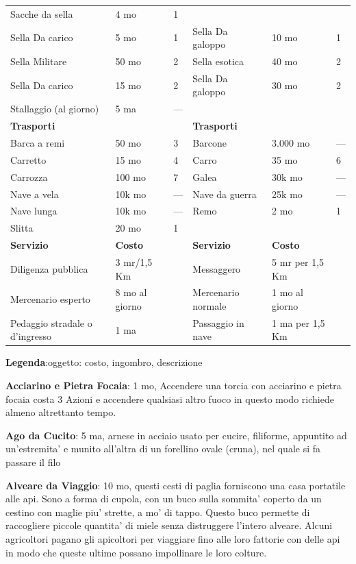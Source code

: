 \documentclass[a4paper,11pt,twoside,openany]{book}
\begin{document}
{\begin{longtable}{|L{4cm} |k{1.5cm} |k{1.5cm}|L{5cm} |k{1.5cm} |k{1.5cm}|}
			Sacche da sella&4 mo&1&&&\\
			Sella Da carico&5 mo&1&	Sella Da galoppo&10 mo&1\\
			Sella Militare&50 mo&2&	Sella esotica &40 mo&2\\
			Sella Da carico&15 mo&2&Sella Da galoppo&30 mo&2\\
			Stallaggio (al giorno)&5 ma&—&&&\\
			\textbf{Trasporti}&&&\textbf{Trasporti}&&\\
			Barca a remi&50 mo&3&	Barcone&3.000 mo&—\\
			Carretto&15 mo&4&	Carro&35 mo&6\\
			Carrozza&100 mo&7&	Galea&30k mo&—\\
			Nave a vela&10k mo&—&	Nave da guerra&25k mo&—\\
			Nave lunga&10k mo&—&	Remo&2 mo&1\\
			Slitta&20 mo&1&&&\\
			\textbf{Servizio}&\textbf{Costo}&&\textbf{Servizio}&\textbf{Costo}&\\
			Diligenza pubblica&3 mr/1,5 Km&&	Messaggero&5 mr per 1,5 Km&\\
			Mercenario esperto&8 mo al giorno&	&Mercenario normale&1 mo al giorno&\\
			Pedaggio stradale o d’ingresso&1 ma&&	Passaggio in nave&1 ma per 1,5 Km&\\
		\end{longtable}
		
		\bigskip
		
		
		\textbf{Legenda}:oggetto: costo, ingombro, descrizione
		
		\textbf{Acciarino e Pietra Focaia}: 1 mo, Accendere una torcia con acciarino e pietra focaia costa 3 Azioni e accendere qualsiasi altro fuoco in questo modo richiede almeno altrettanto tempo.
		
		\textbf{Ago da Cucito}: 5 ma, arnese in acciaio usato per cucire, filiforme, appuntito ad un'estremita' e munito all'altra di un forellino ovale (cruna), nel quale si fa passare il filo
		
		\textbf{Alveare da Viaggio}: 10 mo, questi cesti di paglia forniscono una casa portatile alle api. Sono a forma di cupola, con un buco sulla sommita' coperto da un cestino con maglie piu' strette, a mo' di tappo. Questo buco permette di raccogliere piccole quantita' di miele senza distruggere l'intero alveare. Alcuni agricoltori pagano gli apicoltori per viaggiare fino alle loro fattorie con delle api in modo che queste ultime possano impollinare le loro colture.
		
}
\end{document}

